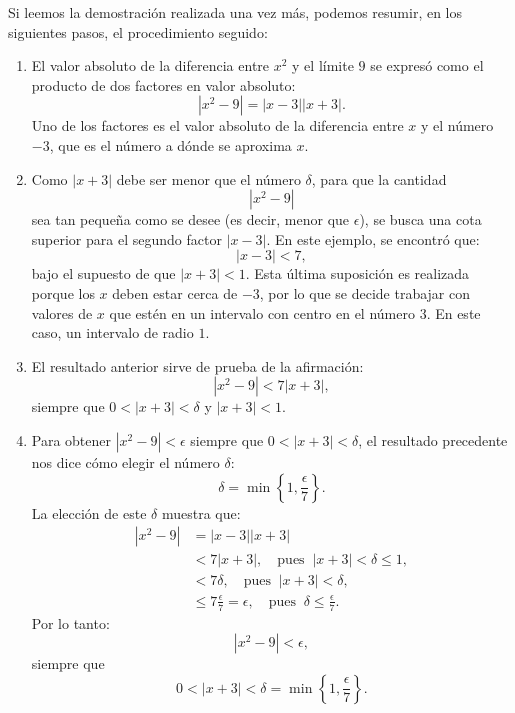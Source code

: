 Si leemos la demostración realizada una vez más, podemos resumir, en los siguientes pasos, el
procedimiento seguido:
\begin{enumerate}
\item El valor absoluto de la diferencia entre $x^2$ y el límite $9$ se expresó como el
    producto de dos factores en valor absoluto:
    \[
        |x^2 - 9| = |x-3||x+3|.
    \]
    Uno de los factores es el valor absoluto de la diferencia entre $x$ y el número $-3$, que
    es el número a dónde se aproxima $x$.

\item Como $|x + 3|$ debe ser menor que el número $\delta$, para que la cantidad
\[
|x^2 - 9|
\]
sea tan pequeña como se desee (es decir, menor que $\epsilon$), se busca una cota superior para
el segundo factor $|x - 3|$. En este ejemplo, se encontró que:
\[
|x - 3| < 7,
\]
bajo el supuesto de que $|x+3| < 1$. Esta última suposición es realizada porque los $x$ deben
estar cerca de $-3$, por lo que se decide trabajar con valores de $x$ que estén en un intervalo
con centro en el número $3$. En este caso, un intervalo de radio $1$.

\item El resultado anterior sirve de prueba de la afirmación:
\[
|x^2 - 9| < 7|x + 3|,
\]
siempre que $0 < |x + 3| < \delta$ y $|x + 3| < 1$.

\item Para obtener $|x^2 - 9| < \epsilon$ siempre que $0 < |x + 3| < \delta$, el resultado
    precedente nos dice cómo elegir el número $\delta$:
\[
\delta = \min\left\{1, \frac{\epsilon}{7}\right\}.
\]
La elección de este $\delta$ muestra que:
\begin{align*}
|x^2 - 9| & = |x - 3||x + 3| \\
& < 7|x + 3|,\quad \text{pues }\ |x + 3| < \delta \leq 1, \\
& < 7 \delta, \quad \text{pues }\ |x + 3| < \delta, \\
& \leq 7\frac{\epsilon}{7} = \epsilon, \quad\text{pues }\ \delta \leq \frac{\epsilon}{7}.
\end{align*}
Por lo tanto:
\[
|x^2 - 9| < \epsilon,
\]
siempre que
\[
0 < |x + 3| < \delta = \min\left\{1, \frac{\epsilon}{7}\right\}.
\]
\end{enumerate}

